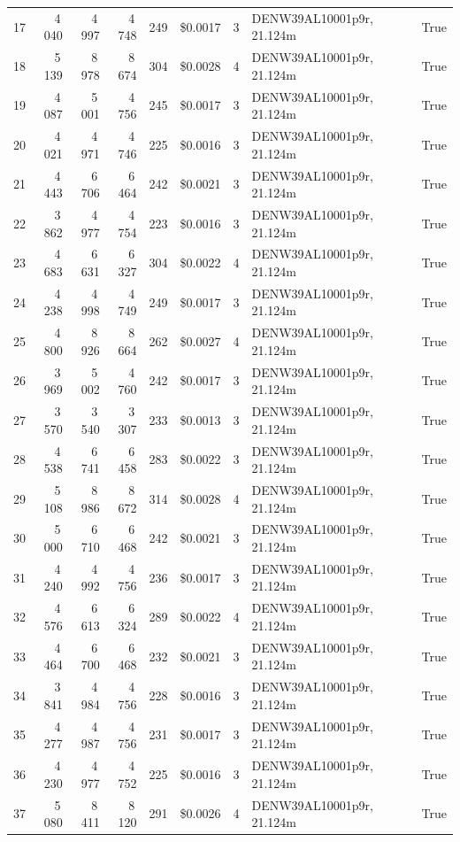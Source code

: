 \documentclass[a4paper,11pt]{article}
\begin{document}
\begin{table}[ht]
\begin{tabular}{r r r r r r r p{3cm} l}
17 & 4\,040 & 4\,997 & 4\,748 & 249 & \$0.0017 & 3 & DENW39AL10001p9r, 21.124m & True \\
18 & 5\,139 & 8\,978 & 8\,674 & 304 & \$0.0028 & 4 & DENW39AL10001p9r, 21.124m & True \\
19 & 4\,087 & 5\,001 & 4\,756 & 245 & \$0.0017 & 3 & DENW39AL10001p9r, 21.124m & True \\
20 & 4\,021 & 4\,971 & 4\,746 & 225 & \$0.0016 & 3 & DENW39AL10001p9r, 21.124m & True \\
21 & 4\,443 & 6\,706 & 6\,464 & 242 & \$0.0021 & 3 & DENW39AL10001p9r, 21.124m & True \\
22 & 3\,862 & 4\,977 & 4\,754 & 223 & \$0.0016 & 3 & DENW39AL10001p9r, 21.124m & True \\
23 & 4\,683 & 6\,631 & 6\,327 & 304 & \$0.0022 & 4 & DENW39AL10001p9r, 21.124m & True \\
24 & 4\,238 & 4\,998 & 4\,749 & 249 & \$0.0017 & 3 & DENW39AL10001p9r, 21.124m & True \\
25 & 4\,800 & 8\,926 & 8\,664 & 262 & \$0.0027 & 4 & DENW39AL10001p9r, 21.124m & True \\
26 & 3\,969 & 5\,002 & 4\,760 & 242 & \$0.0017 & 3 & DENW39AL10001p9r, 21.124m & True \\
27 & 3\,570 & 3\,540 & 3\,307 & 233 & \$0.0013 & 3 & DENW39AL10001p9r, 21.124m & True \\
28 & 4\,538 & 6\,741 & 6\,458 & 283 & \$0.0022 & 3 & DENW39AL10001p9r, 21.124m & True \\
29 & 5\,108 & 8\,986 & 8\,672 & 314 & \$0.0028 & 4 & DENW39AL10001p9r, 21.124m & True \\
30 & 5\,000 & 6\,710 & 6\,468 & 242 & \$0.0021 & 3 & DENW39AL10001p9r, 21.124m & True \\
31 & 4\,240 & 4\,992 & 4\,756 & 236 & \$0.0017 & 3 & DENW39AL10001p9r, 21.124m & True \\
32 & 4\,576 & 6\,613 & 6\,324 & 289 & \$0.0022 & 4 & DENW39AL10001p9r, 21.124m & True \\
33 & 4\,464 & 6\,700 & 6\,468 & 232 & \$0.0021 & 3 & DENW39AL10001p9r, 21.124m & True \\
34 & 3\,841 & 4\,984 & 4\,756 & 228 & \$0.0016 & 3 & DENW39AL10001p9r, 21.124m & True \\
35 & 4\,277 & 4\,987 & 4\,756 & 231 & \$0.0017 & 3 & DENW39AL10001p9r, 21.124m & True \\
36 & 4\,230 & 4\,977 & 4\,752 & 225 & \$0.0016 & 3 & DENW39AL10001p9r, 21.124m & True \\
37 & 5\,080 & 8\,411 & 8\,120 & 291 & \$0.0026 & 4 & DENW39AL10001p9r, 21.124m & True \\

\end{tabular}
\end{table}
\end{document}
